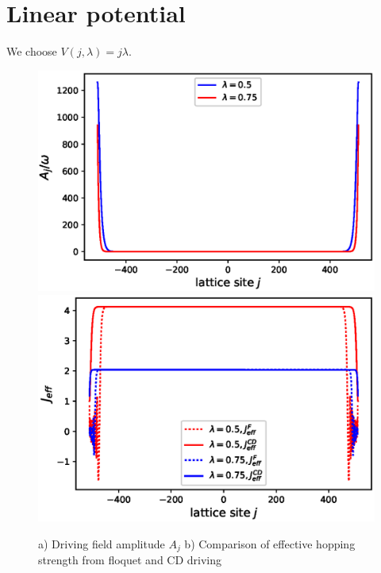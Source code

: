 \documentclass[11pt,a4paper]{article}
\begin{document}


\section{Linear potential}
We choose $V(j, \lambda)= j \lambda$.



\begin{figure}[!ht]
\begin{center}
\includegraphics[scale=0.5]{pics/driving_field_amplitude.eps}
\includegraphics[scale=0.5]{pics/j_eff_f.eps}
\caption{a)   Driving field amplitude $A_j$ b)  Comparison of effective hopping strength from floquet and CD driving }
\end{center}
\end{figure}
\end{document}
